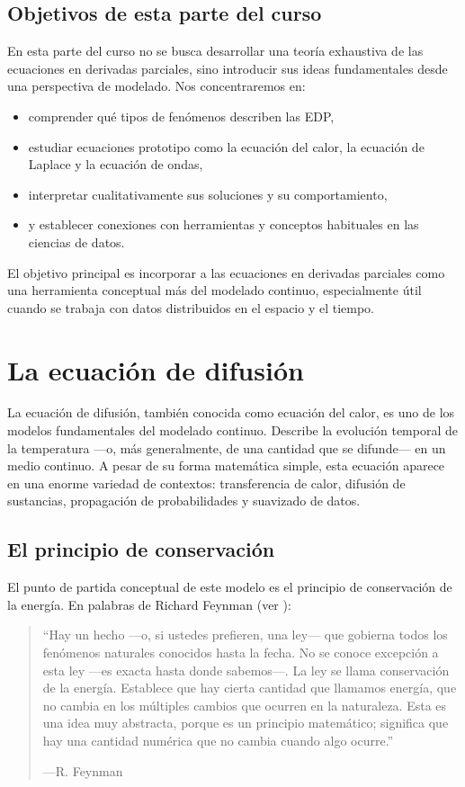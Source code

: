 \documentclass[12pt, a4paper]{amsbook}
\theoremstyle{remark}
\theoremstyle{definition}
\numberwithin{section}{chapter}
\numberwithin{subsection}{section}
\numberwithin{equation}{section}
\numberwithin{figure}{chapter}
\begin{document}
\section{Objetivos de esta parte del curso}

En esta parte del curso no se busca desarrollar una teoría exhaustiva de las ecuaciones en derivadas parciales, sino introducir sus ideas fundamentales desde una perspectiva de modelado. Nos concentraremos en:
\begin{itemize}
    \item comprender qué tipos de fenómenos describen las EDP,
    \item estudiar ecuaciones prototipo como la ecuación del calor, la ecuación de Laplace y la ecuación de ondas,
    \item interpretar cualitativamente sus soluciones y su comportamiento,
    \item y establecer conexiones con herramientas y conceptos habituales en las ciencias de datos.
\end{itemize}

El objetivo principal es incorporar a las ecuaciones en derivadas parciales como una herramienta conceptual más del modelado continuo, especialmente útil cuando se trabaja con datos distribuidos en el espacio y el tiempo.


\chapter{La ecuación de difusión}\label{ch:intro-heat}

La ecuación de difusión, también conocida como ecuación del calor, es uno de los modelos fundamentales del modelado continuo. Describe la evolución temporal de la temperatura —o, más generalmente, de una cantidad que se difunde— en un medio continuo. A pesar de su forma matemática simple, esta ecuación aparece en una enorme variedad de contextos: transferencia de calor, difusión de sustancias, propagación de probabilidades y suavizado de datos.

\section{El principio de conservación}\label{sec:conservacion}

El punto de partida conceptual de este modelo es el principio de conservación de la energía. En palabras de Richard Feynman (ver \cite{Feynman}):

\begin{quote}
``Hay un hecho —o, si ustedes prefieren, una ley— que gobierna todos los fenómenos naturales conocidos hasta la fecha. No se conoce excepción a esta ley —es exacta hasta donde sabemos—. La ley se llama conservación de la energía. Establece que hay cierta cantidad que llamamos energía, que no cambia en los múltiples cambios que ocurren en la naturaleza. Esta es una idea muy abstracta, porque es un principio matemático; significa que hay una cantidad numérica que no cambia cuando algo ocurre.''

\hfill —R. Feynman
\end{quote}
\end{document}

